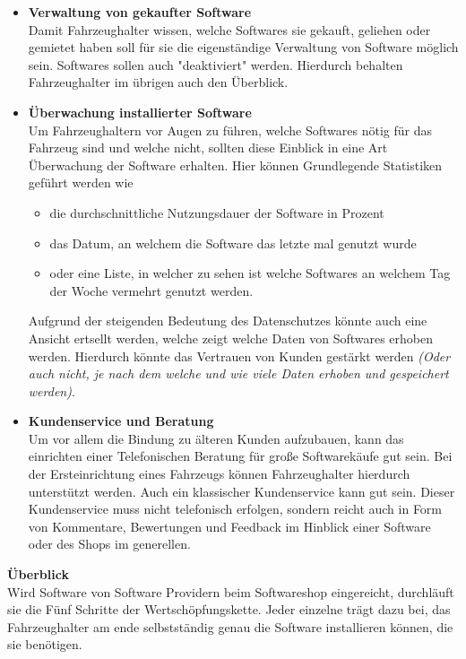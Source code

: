 \begin{itemize}
	\item[] \hspace{-0.6cm} \textbf{Verwaltung von gekaufter Software}\\
	Damit Fahrzeughalter wissen, welche Softwares sie gekauft, geliehen oder gemietet haben soll für sie die eigenständige Verwaltung von Software möglich sein. Softwares sollen auch "deaktiviert" werden. Hierdurch behalten Fahrzeughalter im übrigen auch den Überblick.
	
	\item[] \hspace{-0.6cm} \textbf{Überwachung installierter Software}\\
	Um Fahrzeughaltern vor Augen zu führen, welche Softwares nötig für das Fahrzeug sind und welche nicht, sollten diese Einblick in eine Art Überwachung der Software erhalten. Hier können Grundlegende Statistiken geführt werden wie
	\begin{itemize}
		\item die durchschnittliche Nutzungsdauer der Software in Prozent
		\item das Datum, an welchem die Software das letzte mal genutzt wurde
		\item oder eine Liste, in welcher zu sehen ist welche Softwares an welchem Tag der Woche vermehrt genutzt werden.
	\end{itemize}
	Aufgrund der steigenden Bedeutung des Datenschutzes könnte auch eine Ansicht ertsellt werden, welche zeigt welche Daten von Softwares erhoben werden. Hierdurch könnte das Vertrauen von Kunden gestärkt werden \textit{(Oder auch nicht, je nach dem welche und wie viele Daten erhoben und gespeichert werden)}.
	
	\item[] \hspace{-0.6cm} \textbf{Kundenservice und Beratung}\\
	Um vor allem die Bindung zu älteren Kunden aufzubauen, kann das einrichten einer Telefonischen Beratung für große Softwarekäufe gut sein. Bei der Ersteinrichtung eines Fahrzeugs können Fahrzeughalter hierdurch unterstützt werden. Auch ein klassischer Kundenservice kann gut sein. Dieser Kundenservice muss nicht telefonisch erfolgen, sondern reicht auch in Form von Kommentare, Bewertungen und Feedback im Hinblick einer Software oder des Shops im generellen.
\end{itemize}
\textbf{Überblick}\\
Wird Software von Software Providern beim Softwareshop eingereicht, durchläuft sie die Fünf Schritte der Wertschöpfungskette. Jeder einzelne trägt dazu bei, das Fahrzeughalter am ende selbstständig genau die Software installieren können, die sie benötigen.
